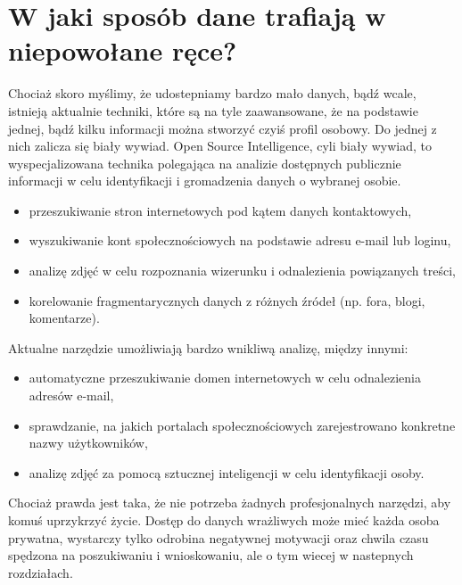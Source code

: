 \section{W jaki sposób dane trafiają w niepowołane ręce?}
Chociaż skoro myślimy, że udostepniamy bardzo mało danych, bądź wcale, istnieją aktualnie techniki, które są na tyle zaawansowane, że na podstawie jednej, bądź kilku informacji można stworzyć czyiś profil osobowy. Do jednej z nich zalicza się biały wywiad. 
Open Source Intelligence, cyli biały wywiad, to wyspecjalizowana technika polegająca na analizie dostępnych publicznie informacji w celu identyfikacji i gromadzenia danych o wybranej osobie.

\begin{itemize}
  \item przeszukiwanie stron internetowych pod kątem danych kontaktowych,
  \item wyszukiwanie kont społecznościowych na podstawie adresu e-mail lub loginu,
  \item analizę zdjęć w celu rozpoznania wizerunku i odnalezienia powiązanych treści,
  \item korelowanie fragmentarycznych danych z różnych źródeł (np. fora, blogi, komentarze).
\end{itemize}

Aktualne narzędzie umożliwiają bardzo wnikliwą analizę, między innymi:

\begin{itemize}
  \item automatyczne przeszukiwanie domen internetowych w celu odnalezienia adresów e-mail,
  \item sprawdzanie, na jakich portalach społecznościowych zarejestrowano konkretne nazwy użytkowników,
  \item analizę zdjęć za pomocą sztucznej inteligencji w celu identyfikacji osoby.
\end{itemize}

Chociaż prawda jest taka, że nie potrzeba żadnych profesjonalnych narzędzi, aby komuś uprzykrzyć życie. Dostęp do danych wrażliwych może mieć każda osoba prywatna, wystarczy tylko odrobina negatywnej motywacji oraz chwila czasu spędzona na poszukiwaniu i wnioskowaniu, ale o tym wiecej w nastepnych rozdziałach. 